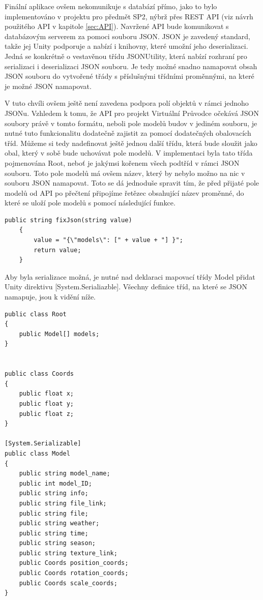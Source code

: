 \documentclass[thesis=B,czech]{FITthesis}[2012/06/26]
\begin{document}
	Finální aplikace ovšem nekomunikuje s databází přímo, jako to bylo implementováno v projektu pro předmět SP2, nýbrž přes REST API (viz návrh použitého API v kapitole \ref{sec:API}). Navržené API bude komunikovat s databázovým serverem za pomoci souboru JSON. JSON je zavedený standard, takže jej Unity podporuje a nabízí i knihovny, které umožní jeho deserializaci. Jedná se konkrétně o vestavěnou třídu JSONUtility, která nabízí rozhraní pro serializaci i deserializaci JSON souboru. Je tedy možné snadno namapovat obsah JSON souboru do vytvořené třády s příslušnými třídními proměnnými, na které je možné JSON namapovat. \cite{UnityJSON}

V tuto chvíli ovšem ještě není zavedena podpora polí objektů v rámci jednoho JSONu. \cite{UnityJSON} Vzhledem k tomu, že API pro projekt Virtuální Průvodce očekává JSON soubory právě v tomto formátu, neboli pole modelů budov v jediném souboru, je nutné tuto funkcionalitu dodatečně zajistit za pomocí dodatečných obalovacích tříd. Můžeme si tedy nadefinovat ještě jednou další třídu, která bude sloužit jako obal, který v sobě bude uchovávat pole modelů. V implementaci byla tato třída pojmenována Root, neboť je jakýmsi kořenem všech podtříd v rámci JSON souboru. Toto pole modelů má ovšem název, který by nebylo možno na nic v souboru JSON namapovat. Toto se dá jednoduše spravit tím, že před přijaté pole modelů od API po přečtení připojíme řetězec obsahující název proměnné, do které se uloží pole modelů s pomocí následující funkce.

\begin{lstlisting}[frame=single]
public string fixJson(string value)
    {
        value = "{\"models\": [" + value + "] }";
        return value;
    }

\end{lstlisting}

Aby byla serializace možná, je nutné nad deklaraci mapovací třídy Model přidat Unity direktivu [System.Serialiazble]. Všechny definice tříd, na které se JSON namapuje, jsou k vidění níže. 

\begin{lstlisting}[frame=single]
public class Root
{
    public Model[] models;
}


public class Coords 
{
    public float x;
    public float y;
    public float z;
}

[System.Serializable]
public class Model
{
    public string model_name;
    public int model_ID;
    public string info;
    public string file_link;
    public string file;
    public string weather;
    public string time;
    public string season;
    public string texture_link;
    public Coords position_coords;
    public Coords rotation_coords;
    public Coords scale_coords;
}
\end{lstlisting}
\end{document}
